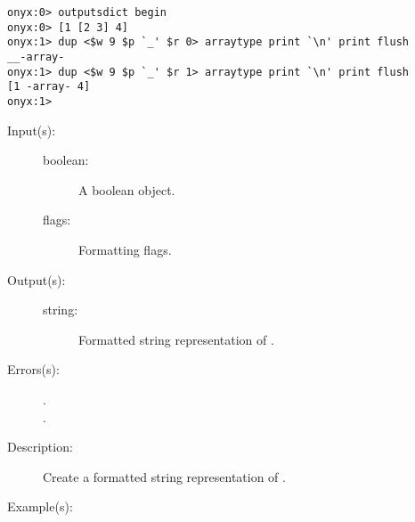 \begin{description}
\begin{description}
\begin{verbatim}
onyx:0> outputsdict begin
onyx:0> [1 [2 3] 4]
onyx:1> dup <$w 9 $p `_' $r 0> arraytype print `\n' print flush
__-array-
onyx:1> dup <$w 9 $p `_' $r 1> arraytype print `\n' print flush
[1 -array- 4]
onyx:1>
		\end{verbatim}
	\end{description}
\label{outputsdict:booleantype}
\item[{\onyxop{boolean flags}{booleantype}{string}}: ]
	\begin{description}\item[]
	\item[Input(s): ]
		\begin{description}\item[]
		\item[boolean: ]
			A boolean object.
		\item[flags: ]
			Formatting flags.
		\end{description}
	\item[Output(s): ]
		\begin{description}\item[]
		\item[string: ]
			Formatted string representation of .
		\end{description}
	\item[Errors(s): ]
		\begin{description}\item[]
		\item[.]
		\item[.]
		\end{description}
	\item[Description: ]
		Create a formatted string representation of .
	\item[Example(s): ]\begin{verbatim}


\end{verbatim}
\end{description}
\end{description}

